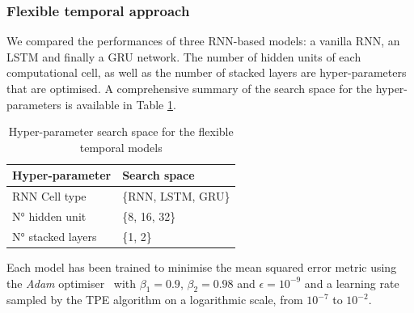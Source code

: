 \subsubsection{Flexible temporal approach}
We compared the performances of three RNN-based models: a vanilla RNN, an LSTM and finally a GRU network. The number of hidden units of each computational cell, as well as the number of stacked layers are hyper-parameters that are optimised. A comprehensive summary of the search space for the hyper-parameters is available in Table \ref{tab:rnn_search_space}. 

\begin{table}
    \centering
    \caption{Hyper-parameter search space for the flexible temporal models}
    \begin{tabular}{ll}
    \toprule
    \textbf{Hyper-parameter} & \textbf{Search space} \\ 
    \midrule
    RNN Cell type & \{RNN, LSTM, GRU\} \\
    N° hidden unit & \{8, 16, 32\} \\
    N° stacked layers & \{1, 2\} \\
    \bottomrule
    \end{tabular}
    \label{tab:rnn_search_space}
\end{table}
Each model has been trained to minimise the mean squared error metric using the  \textit{Adam} optimiser~\citep{kingma2014adam} with $\beta_{1} = 0.9$, $\beta_{2} = 0.98$ and $\epsilon = 10^{-9}$ and a learning rate sampled by the TPE algorithm on a logarithmic scale,  from $10^{-7}$ to $10^{-2}$. 

